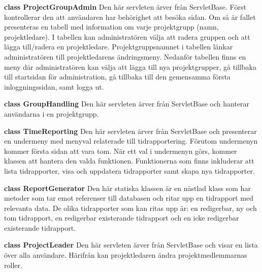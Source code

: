 \documentclass[a4paper]{article}
\begin{document}
\vspace{5mm}
\begin{hangparas}{1.5em}{1}
\textbf{class ProjectGroupAdmin} Den här servleten ärver från ServletBase. Först kontrollerar den att användaren har behörighet att besöka sidan. Om så är fallet presenteras en tabell med information om varje projektgrupp (namn, projektledare). I tabellen kan administratören välja att radera gruppen och att lägga till/radera en projektledare. Projektgruppsnamnet i tabellen länkar administratören till projektledarens ändringsmeny. Nedanför tabellen finns en meny där administratören kan välja att lägga till nya projektgrupper, gå tillbaka till startsidan för administration, gå tillbaka till den gemensamma första inloggningssidan, samt logga ut.
\end{hangparas}

\vspace{5mm}
\begin{hangparas}{1.5em}{1}
\textbf{class GroupHandling} Den här servleten ärver från ServletBase och hanterar användarna i en projektgrupp.
\end{hangparas}

\vspace{5mm}
\begin{hangparas}{1.5em}{1}
\textbf{class TimeReporting} Den här servleten ärver från ServletBase och presenterar en undermeny med menyval relaterade till tidrapportering. Förutom undermenyn kommer första sidan att vara tom. När ett val i undermenyn görs, kommer klassen att hantera den valda funktionen. Funktionerna som finns inkluderar att lista tidrapporter, visa och uppdatera tidrapporter samt skapa nya tidrapporter.
\end{hangparas}

\vspace{5mm}
\begin{hangparas}{1.5em}{1}
\textbf{class ReportGenerator} Den här statiska klassen är en nästlad klass som har metoder som tar emot referenser till databasen och ritar upp en tidrapport med relevanta data. De olika tidrapporter som kan ritas upp är: en redigerbar, ny och tom tidrapport, en redigerbar existerande tidrapport och en icke redigerbar existerande tidrapport.
\end{hangparas}

\vspace{5mm}
\begin{hangparas}{1.5em}{1}
\textbf{class ProjectLeader} Den här servleten ärver från ServletBase och visar en lista över alla användare. Härifrån kan projektledaren ändra projektmedlemmarnas roller. 
\end{hangparas}
\end{document}

